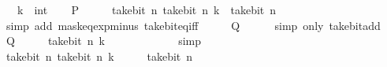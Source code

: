 \begin{isabellebody}
\ \ \ k\ {\isacharcolon}{\kern0pt}{\isacharcolon}{\kern0pt}\ int\isanewline
%
\isadelimproof
%
\endisadelimproof
%
\isatagproof
{}\isamarkupfalse%
\isanewline
\ \ \isamarkupfalse%
\ {\isacharquery}{\kern0pt}P\isanewline
\ \ \isamarkupfalse%
\ \isamarkupfalse%
\ {\isacartoucheopen}take{\isacharunderscore}{\kern0pt}bit\ n\ {\isacharparenleft}{\kern0pt}take{\isacharunderscore}{\kern0pt}bit\ n\ k\ {\isacharplus}{\kern0pt}\ take{\isacharunderscore}{\kern0pt}bit\ n\ {}{\isacharparenright}{\kern0pt}\ {\isacharequal}{\kern0pt}\ {}{\isacartoucheclose}\isanewline
\ \ \ \ \isamarkupfalse%
\ {\isacharparenleft}{\kern0pt}simp\ add{\isacharcolon}{\kern0pt}\ mask{\isacharunderscore}{\kern0pt}eq{\isacharunderscore}{\kern0pt}exp{\isacharunderscore}{\kern0pt}minus{\isacharunderscore}{\kern0pt}{}\ take{\isacharunderscore}{\kern0pt}bit{\isacharunderscore}{\kern0pt}eq{\isacharunderscore}{\kern0pt}{}{\isacharunderscore}{\kern0pt}iff{\isacharparenright}{\kern0pt}\isanewline
\ \ \isamarkupfalse%
\ \isamarkupfalse%
\ {\isacharquery}{\kern0pt}Q\isanewline
\ \ \ \ \isamarkupfalse%
\ {\isacharparenleft}{\kern0pt}simp\ only{\isacharcolon}{\kern0pt}\ take{\isacharunderscore}{\kern0pt}bit{\isacharunderscore}{\kern0pt}add{\isacharparenright}{\kern0pt}\isanewline
{}\isamarkupfalse%
\isanewline
\ \ \isamarkupfalse%
\ {\isacharquery}{\kern0pt}Q\isanewline
\ \ \isamarkupfalse%
\ \isamarkupfalse%
\ {\isacartoucheopen}take{\isacharunderscore}{\kern0pt}bit\ n\ {\isacharparenleft}{\kern0pt}k\ {\isacharplus}{\kern0pt}\ {}{\isacharparenright}{\kern0pt}\ {\isacharminus}{\kern0pt}\ {}\ {\isacharequal}{\kern0pt}\ {\isacharminus}{\kern0pt}\ {}{\isacartoucheclose}\isanewline
\ \ \ \ \isamarkupfalse%
\ simp\isanewline
\ \ \isamarkupfalse%
\ \isamarkupfalse%
\ {\isacartoucheopen}take{\isacharunderscore}{\kern0pt}bit\ n\ {\isacharparenleft}{\kern0pt}take{\isacharunderscore}{\kern0pt}bit\ n\ {\isacharparenleft}{\kern0pt}k\ {\isacharplus}{\kern0pt}\ {}{\isacharparenright}{\kern0pt}\ {\isacharminus}{\kern0pt}\ {}{\isacharparenright}{\kern0pt}\ {\isacharequal}{\kern0pt}\ take{\isacharunderscore}{\kern0pt}bit\ n\ {\isacharparenleft}{\kern0pt}{\isacharminus}{\kern0pt}\ {}{\isacharparenright}{\kern0pt}{\isacartoucheclose}\isanewline

\end{isabellebody}
